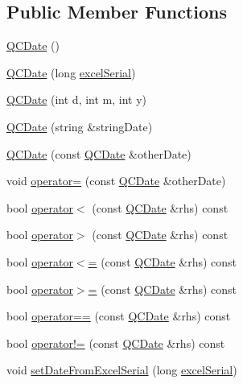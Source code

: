 \subsection*{Public Member Functions}
\begin{DoxyCompactItemize}
\item 
\hyperlink{class_q_c_date_a4668aa0f8cc6671f1f4413a9d9152bce}{Q\+C\+Date} ()
\item 
\hyperlink{class_q_c_date_aa4234ef62a09004355f1a8c227bb0b80}{Q\+C\+Date} (long \hyperlink{class_q_c_date_a91dae9aacdc06dcc3c3aaac686a6a6f7}{excel\+Serial})
\item 
\hyperlink{class_q_c_date_a9f91ba907afd6cce87c9d1d114658ac4}{Q\+C\+Date} (int d, int m, int y)
\item 
\hyperlink{class_q_c_date_a8e41bf9b439d97d9abe4e9ee25f719a9}{Q\+C\+Date} (string \&string\+Date)
\item 
\hyperlink{class_q_c_date_af5f2687a03cda466dc5da09a60b88f69}{Q\+C\+Date} (const \hyperlink{class_q_c_date}{Q\+C\+Date} \&other\+Date)
\item 
void \hyperlink{class_q_c_date_a4f0c7ff2fb664ca4daa7904145430552}{operator=} (const \hyperlink{class_q_c_date}{Q\+C\+Date} \&other\+Date)
\item 
bool \hyperlink{class_q_c_date_aae27db758f29a013c3f845b2e1a07f52}{operator$<$} (const \hyperlink{class_q_c_date}{Q\+C\+Date} \&rhs) const 
\item 
bool \hyperlink{class_q_c_date_aa88cc696fb1f87212e9ceba4226d925d}{operator$>$} (const \hyperlink{class_q_c_date}{Q\+C\+Date} \&rhs) const 
\item 
bool \hyperlink{class_q_c_date_a4a7c6e33664af9bbe09b7f0a0fa74288}{operator$<$=} (const \hyperlink{class_q_c_date}{Q\+C\+Date} \&rhs) const 
\item 
bool \hyperlink{class_q_c_date_a741cc0cd4e2424a0218009f5a412f78c}{operator$>$=} (const \hyperlink{class_q_c_date}{Q\+C\+Date} \&rhs) const 
\item 
bool \hyperlink{class_q_c_date_ab0663f35f0ba5772ff78a25dc5359ad6}{operator==} (const \hyperlink{class_q_c_date}{Q\+C\+Date} \&rhs) const 
\item 
bool \hyperlink{class_q_c_date_ac98d34b3105e66151643fd8cb1f9d3e7}{operator!=} (const \hyperlink{class_q_c_date}{Q\+C\+Date} \&rhs) const 
\item 
void \hyperlink{class_q_c_date_a5c291812c6186f241dfbf2d38e443fa4}{set\+Date\+From\+Excel\+Serial} (long \hyperlink{class_q_c_date_a91dae9aacdc06dcc3c3aaac686a6a6f7}{excel\+Serial})
\item 

\end{DoxyCompactItemize}

